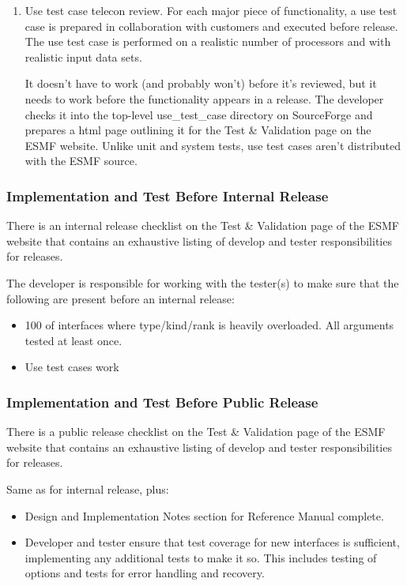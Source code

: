 \begin{enumerate}
\item Use test case telecon review. For each major piece of functionality, a use
test case is prepared in collaboration with customers and executed before
release. The use test case is performed on a realistic number of processors
and with realistic input data sets.

It doesn't have to work (and probably won't) before it's reviewed, but it
needs to work before the functionality appears in a release. The developer
checks it into the top-level use\_test\_case directory on SourceForge and
prepares a html page outlining it for the Test \& Validation page on the
ESMF website. Unlike unit and system tests, use test cases aren't
distributed with the ESMF source.
\end{enumerate}

\subsubsection{Implementation and Test Before Internal Release}

There is an internal release checklist on the Test \& Validation page of the
ESMF website that contains an exhaustive listing of develop and tester
responsibilities for releases.

The developer is responsible for working with the tester(s) to make sure
that the following are present before an internal release:
\begin{itemize}
\item 100%
of interfaces where type/kind/rank is heavily overloaded. All arguments tested
at least once.
\item Use test cases work
\end{itemize}

\subsubsection{Implementation and Test Before Public Release}

There is a public release checklist on the Test \& Validation page of the ESMF
website that contains an exhaustive listing of develop and tester responsibilities for releases.

Same as for internal release, plus:
\begin{itemize}
\item Design and Implementation Notes section for Reference Manual complete.
\item Developer and tester ensure that test coverage for new interfaces is sufficient, implementing any additional tests to make it so. This includes testing of options and tests for error handling and recovery.
\end{itemize}

